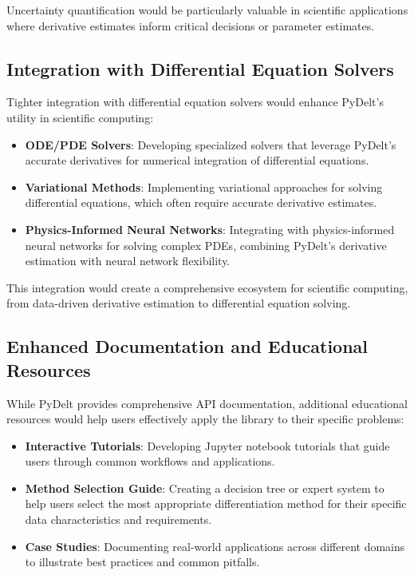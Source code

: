 \documentclass[11pt,a4paper]{article}
\begin{document}
Uncertainty quantification would be particularly valuable in scientific applications where derivative estimates inform critical decisions or parameter estimates.

\subsection{Integration with Differential Equation Solvers}

Tighter integration with differential equation solvers would enhance PyDelt's utility in scientific computing:

\begin{itemize}
    \item \textbf{ODE/PDE Solvers}: Developing specialized solvers that leverage PyDelt's accurate derivatives for numerical integration of differential equations.
    
    \item \textbf{Variational Methods}: Implementing variational approaches for solving differential equations, which often require accurate derivative estimates.
    
    \item \textbf{Physics-Informed Neural Networks}: Integrating with physics-informed neural networks for solving complex PDEs, combining PyDelt's derivative estimation with neural network flexibility.
\end{itemize}

This integration would create a comprehensive ecosystem for scientific computing, from data-driven derivative estimation to differential equation solving.

\subsection{Enhanced Documentation and Educational Resources}

While PyDelt provides comprehensive API documentation, additional educational resources would help users effectively apply the library to their specific problems:

\begin{itemize}
    \item \textbf{Interactive Tutorials}: Developing Jupyter notebook tutorials that guide users through common workflows and applications.
    
    \item \textbf{Method Selection Guide}: Creating a decision tree or expert system to help users select the most appropriate differentiation method for their specific data characteristics and requirements.
    
    \item \textbf{Case Studies}: Documenting real-world applications across different domains to illustrate best practices and common pitfalls.
\end{itemize}
\end{document}
